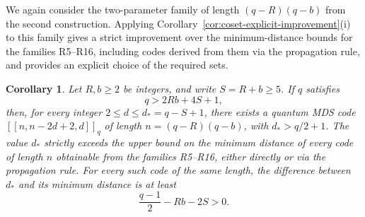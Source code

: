 \documentclass[preprint,12pt,a4paper]{elsarticle}
\newtheorem{corollary}[theorem]{Corollary}
\newcommand{\qcode}[3]{\left[\!\left[#1,#2,#3\right]\!\right]_q}
\begin{document}
We again consider the two-parameter family of length $(q-R)(q-b)$ from the second construction. Applying Corollary~\ref{cor:coset-explicit-improvement}\textup{(i)} to this family gives a strict improvement over the minimum-distance bounds for the families R5--R16, including codes derived from them via the propagation rule, and provides an explicit choice of the required sets.

\begin{corollary}\label{cor:second-coset-family}
Let $R,b\ge2$ be integers, and write $S=R+b\ge5$. If $q$ satisfies
\begin{equation}\label{eq:second-coset-range}
 q>2Rb+4S+1,
\end{equation}
then, for every integer $2\le d\le d_*=q-S+1$, there exists a quantum MDS code $\qcode{n}{n-2d+2}{d}$ of length $n=(q-R)(q-b)$, with $d_*>q/2+1$. The value $d_*$ strictly exceeds the upper bound on the minimum distance of every code of length $n$ obtainable from the families R5--R16, either directly or via the propagation rule. For every such code of the same length, the difference between $d_*$ and its minimum distance is at least
\[
 \frac{q-1}{2}-Rb-2S>0.
\]
\end{corollary}
\end{document}
